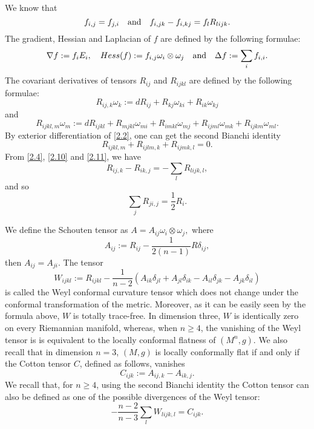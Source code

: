 \documentclass{amsart}
\theoremstyle{definition}
\theoremstyle{remark}
\numberwithin{equation}{section}
\begin{document}
We know that
\begin{equation}\label{2.7}
f_{i,j}=f_{j,i} \quad {\rm and }\quad f_{i,jk}-f_{i,kj}=f_{l}R_{lijk}.
\end{equation}
The gradient, Hessian and Laplacian of $f$ are defined by the following formulae:
\begin{equation}\label{2.8}
\nabla f:= f_{i}E_{i}, \quad  Hess(f):=f_{i,j}\omega_{i}\otimes \omega_{j} \quad {\rm and }\quad 
\Delta f:=\sum\limits_{i}f_{i,i}.
\end{equation}
The covariant derivatives of tensors $R_{ij}$ and $R_{ijkl}$
are defined by the following formulae:
\begin{equation}\label{2.9}
R_{ij,k}\omega_{k}:=dR_{ij}+R_{kj}\omega_{ki}+R_{ik}\omega_{kj}
\end{equation}
and
\begin{equation}\label{2.10}
R_{ijkl,m}\omega_{m}:=dR_{ijkl}+R_{mjkl}\omega_{mi}+
R_{imkl}\omega_{mj}+R_{ijml}\omega_{mk}+R_{ijkm}\omega_{ml}.
\end{equation}
By exterior differentiation of \eqref{2.2}, one can get the second Bianchi identity
\begin{equation}\label{2.11}
R_{ijkl,m}+R_{ijlm,k}+R_{ijmk,l}=0.
\end{equation}
From \eqref{2.4}, \eqref{2.10} and \eqref{2.11}, we have
\begin{equation}\label{2.12}
R_{ij,k}-R_{ik,j}=-\sum\limits_{l}R_{lijk,l},
\end{equation}
and so
\begin{equation}\label{2.13}
\sum\limits_{j}R_{ji,j}=\frac{1}{2}R_{i}.
\end{equation}

We define the Schouten tensor as
$A=A_{ij}\omega_{i}\otimes \omega_{j},$
where
\begin{equation}\label{2.14}
A_{ij}:=R_{ij}-\frac{1}{2(n-1)}R \delta_{ij},
\end{equation}
then $A_{ij}=A_{ji}$. The tensor
\begin{equation}\label{2.15}
W_{ijkl}:=R_{ijkl}-\frac{1}{n-2}
(A_{ik}\delta_{jl}+A_{jl}\delta_{ik}-
A_{il}\delta_{jk}-A_{jk}\delta_{il})
\end{equation}
is called the Weyl conformal curvature tensor which does not change under the conformal
transformation of the metric. Moreover, as it can be easily seen by the formula above,
$W$ is totally trace-free. 
In dimension three, $W$ is identically zero on every Riemannian manifold, whereas,
when $n\geq 4$, the vanishing of the Weyl tensor is
is equivalent to the locally conformal flatness of $(M^n,g)$. We also recall that in dimension $n=3$, 
$(M, g)$ is locally conformally flat if and only if the Cotton tensor $C$, defined as follows, vanishes
\begin{equation}\label{2.16}
C_{ijk} := A_{ij,k} - A_{ik,j}.
\end{equation} 
We recall that, for $n\geq 4$,  using the second Bianchi identity 
the Cotton tensor can also be defined as one of the possible divergences of the Weyl tensor:
\begin{equation}\label{2.17}
-\frac{n-2}{n-3}\sum\limits_{l} W_{lijk,l}= C_{ijk}.
\end{equation}
\end{document}
